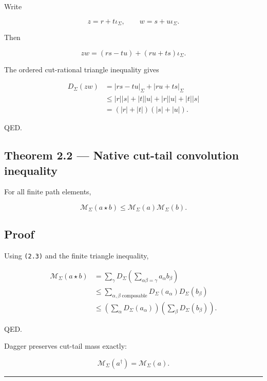 Write

\[
z=r+t\iota_\Sigma,
\qquad
w=s+u\iota_\Sigma.
\]

Then

\[
zw=(rs-tu)+(ru+ts)\iota_\Sigma.
\]

The ordered cut-rational triangle inequality gives

\[
\begin{aligned}
D_\Sigma(zw)
&=|rs-tu|_\Sigma+|ru+ts|_\Sigma\\
&\le |r||s|+|t||u|+|r||u|+|t||s|\\
&=(|r|+|t|)(|s|+|u|).
\end{aligned}
\]

QED.

\hypertarget{theorem-2.2-native-cut-tail-convolution-inequality}{%
\subsection{Theorem 2.2 --- Native cut-tail convolution inequality}\label{theorem-2.2-native-cut-tail-convolution-inequality}}

For all finite path elements,

\[
\boxed{
\mathcal M_\Sigma(a\star b)
\le
\mathcal M_\Sigma(a)\mathcal M_\Sigma(b).
}
\tag{2.4}
\]

\hypertarget{proof-1}{%
\subsection{Proof}\label{proof-1}}

Using \texttt{(2.3)} and the finite triangle inequality,

\[
\begin{aligned}
\mathcal M_\Sigma(a\star b)
&=
\sum_\gamma
D_\Sigma\left(
\sum_{\alpha\beta=\gamma}a_\alpha b_\beta
\right)\\
&\le
\sum_{\alpha,\beta\;\mathrm{composable}}
D_\Sigma(a_\alpha)D_\Sigma(b_\beta)\\
&\le
\left(\sum_\alpha D_\Sigma(a_\alpha)\right)
\left(\sum_\beta D_\Sigma(b_\beta)\right).
\end{aligned}
\]

QED.

Dagger preserves cut-tail mass exactly:

\[
\mathcal M_\Sigma(a^\dagger)=\mathcal M_\Sigma(a).
\tag{2.5}
\]

\begin{center}\rule{0.5\linewidth}{0.5pt}\end{center}


